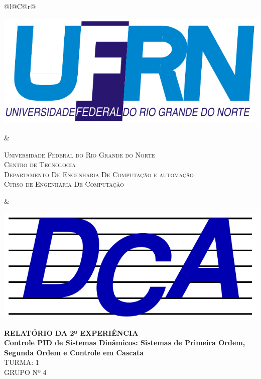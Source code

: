 \documentclass[a4paper,12pt]{article}
\begin{document}
\onehalfspacing

\thispagestyle{empty}

\setcounter{page}{1}







\begin{center}



\begin{tabularx}{\linewidth}{@{}l@{}C@{}r@{}}
    \parbox[c]{3cm}{\includegraphics[width=\linewidth]{UFRN.pdf}} &
        \begin{center}
            \textsf{\textsc{Universidade Federal do Rio Grande do Norte\\
            Centro de Tecnologia\\
            Departamento De Engenharia De Computação e automação\\
            Curso de Engenharia De Computação}}
        \end{center} &
    \parbox[c]{2cm}{\includegraphics[width=\linewidth]{DCA.pdf}}
\end{tabularx}

\vspace{2.5cm}

{\bf{\large RELATÓRIO DA 2º EXPERIÊNCIA\\
Controle PID de Sistemas Dinâmicos: Sistemas de Primeira Ordem, Segunda Ordem e Controle em Cascata\\
}}
\vspace{1.5cm}
{\large TURMA: 1\\
	GRUPO Nº 4}


\end{center}
\end{document}
